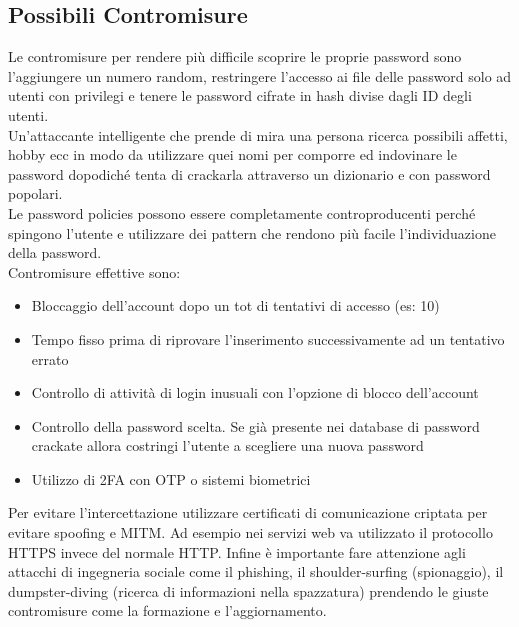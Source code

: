 \subsection{Possibili Contromisure}
Le contromisure per rendere più difficile scoprire le proprie password sono l'aggiungere un numero random, restringere l'accesso ai file delle password solo ad utenti con privilegi e tenere le password cifrate in hash divise dagli ID degli utenti.\\
Un'attaccante intelligente che prende di mira una persona ricerca possibili affetti, hobby ecc in modo da utilizzare quei nomi per comporre ed indovinare le password dopodiché tenta di crackarla attraverso un dizionario e con password popolari.\\
Le password policies possono essere completamente controproducenti perché spingono l'utente e utilizzare dei pattern che rendono più facile l'individuazione della password.\\
Contromisure effettive sono:
\begin{itemize}[noitemsep]
    \item Bloccaggio dell'account dopo un tot di tentativi di accesso (es: 10)
    \item Tempo fisso prima di riprovare l'inserimento successivamente ad un tentativo errato
    \item Controllo di attività di login inusuali con l'opzione di blocco dell'account
    \item Controllo della password scelta. Se già presente nei database di password crackate allora costringi l'utente a scegliere una nuova password
    \item Utilizzo di \acrshort{2FA} con \acrshort{OTP} o sistemi biometrici
\end{itemize}
Per evitare l'intercettazione utilizzare certificati di comunicazione criptata per evitare spoofing e \acrshort{MITM}.
Ad esempio nei servizi web va utilizzato il protocollo \acrshort{HTTPS} invece del normale \acrshort{HTTP}.
Infine è importante fare attenzione agli attacchi di ingegneria sociale come il phishing, il shoulder-surfing (spionaggio), il dumpster-diving (ricerca di informazioni nella spazzatura) prendendo le giuste contromisure come la formazione e l'aggiornamento.
